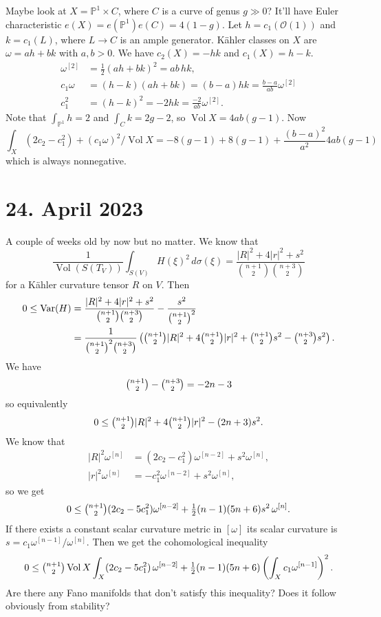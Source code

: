 \documentclass[11pt]{amsart}
\theoremstyle{definition}
\newcommand{\kk}[1]{\mathbb{#1}}
\def\^#1{^{[#1]}}
\DeclareMathOperator{\Vol}{Vol}
\begin{document}
Maybe look at $X = \kk P^1 \times C$, where $C$ is a curve of genus $g \gg 0$?
It'll have Euler characteristic $e(X) = e(\kk P^1) e(C) = 4(1-g)$.
Let $h = c_1(\mathcal O(1))$ and $k = c_1(L)$, where $L \to C$ is an ample generator.
K\"ahler classes on $X$ are $\omega = ah + bk$ with $a, b > 0$.
We have $c_2(X) = -hk$ and $c_1(X) = h - k$.
\begin{align*}
\omega\^2 &=\tfrac12 (ah + bk)^2 = ab \, hk,
\\
c_1 \omega &= (h-k)(ah + bk) = (b - a) hk = \frac{b-a}{ab} \omega\^2
\\
c_1^2 &= (h-k)^2 = -2 hk = \frac{-2}{ab} \omega\^2.
\end{align*}
Note that $\int_{\kk P^1} h = 2$ and $\int_{C} k = 2g-2$, so $\Vol X = 4ab(g-1)$.
Now
$$
\int_X(2c_2 - c_1^2) + (c_1 \omega)^2 / \Vol X
= -8(g-1) + 8(g-1) + \frac{(b-a)^2}{a^2} 4ab(g-1)
$$
which is always nonnegative.


\section{24. April 2023}

A couple of weeks old by now but no matter.
We know that
$$
\frac{1}{\Vol(S(T_V))} \int_{S(V)} H(\xi)^2 \, d\sigma(\xi)
= \frac{|R|^2 + 4|r|^2 + s^2}{\binom{n+1}{2}\binom{n+3}{2}}
$$
for a K\"ahler curvature tensor $R$ on $V$.
Then
\begin{align*}
0
\leq \operatorname{Var}(H)
&=
\frac{|R|^2 + 4|r|^2 + s^2}{\binom{n+1}{2}\binom{n+3}{2}}
- \frac{s^2}{\binom{n+1}{2}^2}
\\
&= \frac{1}{\binom{n+1}{2}^2\binom{n+3}{2}}
\left(
\tbinom{n+1}{2} |R|^2
+ 4\tbinom{n+1}{2} |r|^2
+ \tbinom{n+1}{2} s^2
- \tbinom{n+3}{2} s^2
\right).
\end{align*}
We have
$$
\tbinom{n+1}{2}
- \tbinom{n+3}{2}
= -2n - 3
$$
so equivalently
$$
0 \leq
\tbinom{n+1}{2} |R|^2
+ 4\tbinom{n+1}{2} |r|^2
- (2n+3) s^2.
$$
We know that
\begin{align*}
|R|^2 \omega\^{n}
&= (2c_2 - c_1^2) \omega\^{n-2} + s^2 \omega\^n,
\\
|r|^2 \omega\^{n}
&= -c_1^2 \omega\^{n-2} + s^2 \omega\^n,
\end{align*}
so we get
$$
0
\leq
\tbinom{n+1}{2} (2c_2 - 5c_1^2) \omega\^{n-2}
+ \tfrac12 (n-1)(5n+6) s^2 \, \omega\^n.
$$
If there exists a constant scalar curvature metric in $[\omega]$ its scalar
curvature is $s = c_1 \omega\^{n-1} / \omega\^n$.
Then we get the cohomological inequality
$$
0
\leq
\tbinom{n+1}{2}
\Vol X
\int_X (2c_2 - 5c_1^2) \, \omega\^{n-2}
+ \tfrac12 (n-1)(5n+6)
\left(
\int_X c_1 \omega\^{n-1}
\right)^2.
$$
Are there any Fano manifolds that don't satisfy this inequality?
Does it follow obviously from stability?
\end{document}
